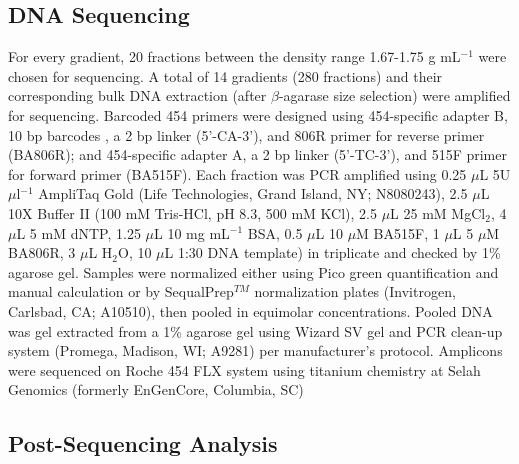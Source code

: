 \documentclass{article}
\begin{document}
\subsection{DNA Sequencing}  For every gradient, 20 fractions between the
density range 1.67-1.75 g mL$^{-1}$ were chosen for sequencing. A total of
14 gradients (280 fractions) and their corresponding bulk DNA extraction
(after $\beta$-agarase size selection) were amplified for sequencing.
Barcoded 454 primers were designed using 454-specific adapter B, 10 bp
barcodes \citep{Hamady_2008}, a 2 bp linker (5'-CA-3'), and 806R primer
for reverse primer (BA806R); and 454-specific adapter A, a 2 bp linker
(5'-TC-3'), and 515F primer for forward primer (BA515F). Each fraction was
PCR amplified using 0.25 $\mu$L 5U $\mu$l$^{-1}$ AmpliTaq Gold (Life
Technologies, Grand Island, NY; N8080243), 2.5 $\mu$L 10X Buffer II (100
mM Tris-HCl, pH 8.3, 500 mM KCl), 2.5 $\mu$L 25 mM MgCl$_{2}$, 4 $\mu$L
5 mM dNTP,
1.25 $\mu$L 10 mg mL$^{-1}$ BSA, 0.5 $\mu$L 10 $\mu$M BA515F,
1 $\mu$L 5 $\mu$M BA806R, 3 $\mu$L H$_{2}$O, 10 $\mu$L 1:30 DNA template) in
triplicate and checked by 1\% agarose gel. Samples were normalized either using
Pico green quantification and manual calculation or by
SequalPrep$^{TM}$ normalization plates (Invitrogen, Carlsbad, CA;
A10510), then pooled in equimolar concentrations. Pooled DNA was gel extracted
from a 1\% agarose gel using Wizard SV gel and PCR clean-up system (Promega,
Madison, WI; A9281) per manufacturer's protocol.  Amplicons were sequenced on
Roche 454 FLX system using titanium chemistry at Selah Genomics (formerly
EnGenCore, Columbia, SC)    

\subsection{Post-Sequencing Analysis}
\end{document}
